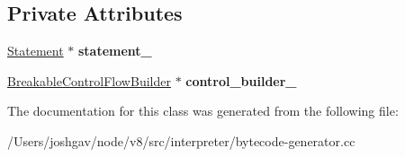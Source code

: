 \subsection*{Private Attributes}
\begin{DoxyCompactItemize}
\item 
\hyperlink{classv8_1_1internal_1_1_statement}{Statement} $\ast$ {\bfseries statement\+\_\+}\hypertarget{classv8_1_1internal_1_1interpreter_1_1_bytecode_generator_1_1_control_scope_for_breakable_a89d3ccc74eda34c0280008d0e9ef3623}{}\label{classv8_1_1internal_1_1interpreter_1_1_bytecode_generator_1_1_control_scope_for_breakable_a89d3ccc74eda34c0280008d0e9ef3623}

\item 
\hyperlink{classv8_1_1internal_1_1interpreter_1_1_breakable_control_flow_builder}{Breakable\+Control\+Flow\+Builder} $\ast$ {\bfseries control\+\_\+builder\+\_\+}\hypertarget{classv8_1_1internal_1_1interpreter_1_1_bytecode_generator_1_1_control_scope_for_breakable_aec3baa5d0255f1dc878dc9323acc5ec6}{}\label{classv8_1_1internal_1_1interpreter_1_1_bytecode_generator_1_1_control_scope_for_breakable_aec3baa5d0255f1dc878dc9323acc5ec6}

\end{DoxyCompactItemize}


The documentation for this class was generated from the following file\+:\begin{DoxyCompactItemize}
\item 
/\+Users/joshgav/node/v8/src/interpreter/bytecode-\/generator.\+cc\end{DoxyCompactItemize}
